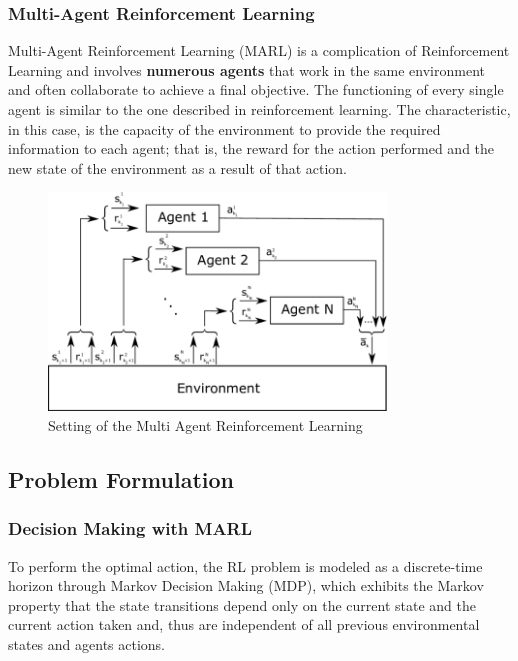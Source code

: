 \subsubsection{Multi-Agent Reinforcement Learning}
Multi-Agent Reinforcement Learning (MARL) is a complication of Reinforcement Learning and involves \textbf{numerous agents} that work in the same environment and often collaborate to achieve a final objective. The functioning of every single agent is similar to the one described in reinforcement learning. The characteristic, in this case, is the capacity of the environment to provide the required information to each agent;  that is, the reward for the action performed and the new state of the environment as a result of that action.
\begin{figure}[h]
    \centering
    \includegraphics[width=0.8\textwidth]{RL immagini/MARL.png}
    \caption{Setting of the Multi Agent Reinforcement Learning}
    \label{fig:MARL}
\end{figure}



\subsection{Problem Formulation}

\subsubsection{Decision Making with MARL}
To perform the optimal action, the RL problem is modeled as a discrete-time horizon through Markov Decision Making (MDP), which exhibits the Markov property that the state transitions depend only on the current state and the current action taken and, thus are independent of all previous environmental states and agents actions.

